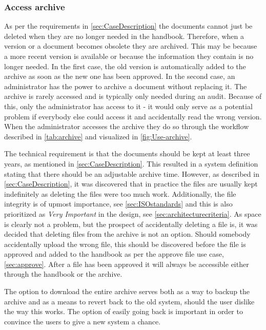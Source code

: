 \subsubsection{Access archive}
As per the requirements in \cref{sec:CaseDescription} the documents cannot just be deleted when they are no longer needed in the handbook.
Therefore, when a version or a document becomes obsolete they are archived.
This may be because a more recent version is available or because the information they contain is no longer needed.
In the first case, the old version is automatically added to the archive as soon as the new one has been approved.
In the second case, an administrator has the power to archive a document without replacing it.
The archive is rarely accessed and is typically only needed during an audit.
Because of this, only the administrator has access to it - it would only serve as a potential problem if everybody else could access it and accidentally read the wrong version.
When the administrator accesses the archive they do so through the workflow described in \cref{tab:archive} and visualized in \cref{fig:Use-archive}.




The technical requirement is that the documents should be kept at least three years, as mentioned in \cref{sec:CaseDescription}.
This resulted in a system definition stating that there should be an adjustable archive time.
However, as described in \cref{sec:CaseDescription}, it was discovered that in practice the files are usually kept indefinitely as deleting the files were too much work.
Additionally, the file integrity is of upmost importance, see \cref{sec:ISOstandards} and this is also prioritized as \textit{Very Important} in the design, see \cref{sec:architecturecriteria}.
As space is clearly not a problem, but the prospect of accidentally deleting a file is, it was decided that deleting files from the archive is not an option.
Should somebody accidentally upload the wrong file, this should be discovered before the file is approved and added to the handbook as per the approve file use case, \cref{sec:approve}.
After a file has been approved it will always be accessible either through the handbook or the archive.

The option to download the entire archive serves both as a way to backup the archive and as a means to revert back to the old system, should the user dislike the way this works.
The option of easily going back is important in order to convince the users to give a new system a chance.

